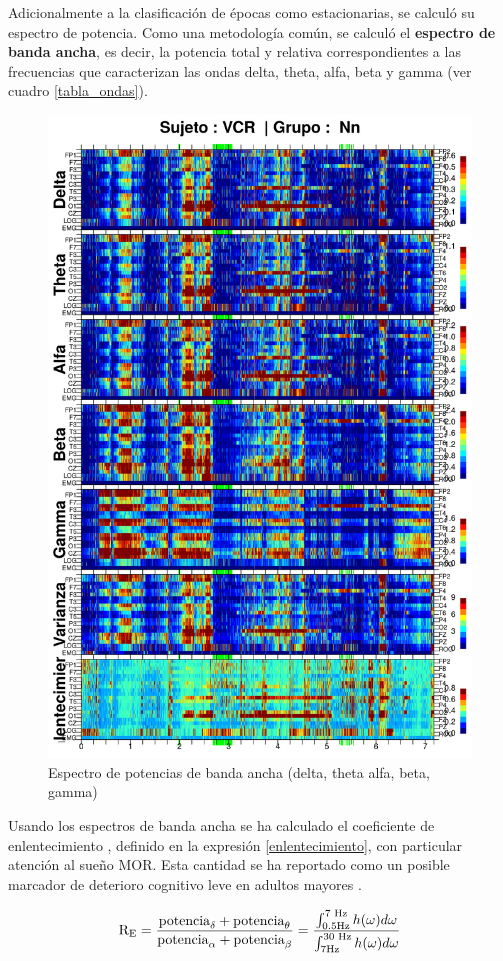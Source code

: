 Adicionalmente a la clasificación de épocas como estacionarias, se calculó su espectro de potencia. 
Como una metodología común, se calculó el \textbf{espectro de banda ancha},
es decir, la potencia total y relativa correspondientes a las frecuencias que caracterizan las ondas 
delta, theta, alfa, beta y gamma (ver cuadro \ref{tabla_ondas}).

\begin{figure}
\centering
\includegraphics[width=0.8\linewidth]
{./enlentecimiento/VCNNS1_espectral_total.png} 
\caption[Espectro de potencias de banda ancha]{Espectro de potencias de banda ancha (delta, theta
alfa, beta, gamma)}
\end{figure}

Usando los espectros de banda ancha se ha calculado el coeficiente de enlentecimiento \lento, 
definido en la 
expresión \ref{enlentecimiento}, con particular atención al sueño MOR. Esta cantidad
se ha reportado como un posible marcador de deterioro cognitivo leve en adultos mayores 
\cite{Brayet16}.

\begin{equation}
\text{R}_{\text{E}} = \frac{\text{potencia}_{\delta}+\text{potencia}_{\theta}}
{\text{potencia}_{\alpha}+\text{potencia}_{\beta}} =
\frac{\int_{\text 0.5 \si{\hertz}}^{\text{7 \si{\hertz}}}h(\omega) d\omega}
{\int_{\text 7 \si{\hertz}}^{\text{30 \si{\hertz}}}h(\omega) d\omega}
\label{enlentecimiento}
\end{equation}

